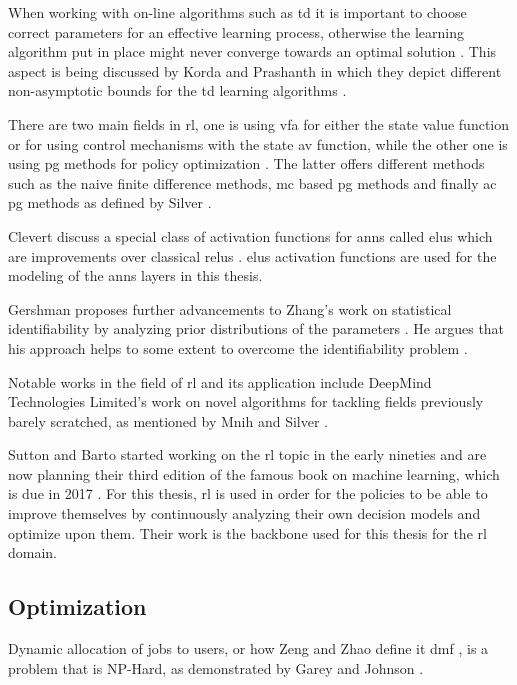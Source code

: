 \documentclass{seal_thesis}
\begin{document}
When working with on-line algorithms such as \gls{td} it is important to choose correct parameters for an effective learning process, otherwise the learning algorithm put in place might never converge towards an optimal solution \cite{Sutton2017}. This aspect is being discussed by Korda and Prashanth in which they depict different non-asymptotic bounds for the \gls{td} learning algorithms \cite{Korda2014}.

There are two main fields in \gls{rl}, one is using \gls{vfa} for either the state value function or for using control mechanisms with the state \gls{av} function, while the other one is using \gls{pg} methods for policy optimization \cite{Sutton2017}. The latter offers different methods such as the naive finite difference methods, \gls{mc} based \gls{pg} methods and finally \gls{ac} \gls{pg} methods as defined by Silver \etal \cite{Silver2014}.

Clevert \etal discuss a special class of activation functions for \glspl{ann} called \glspl{elu} which are improvements over classical \glspl{relu} \cite{Clevert2015}. \glspl{elu} activation functions are used for the modeling of the \glspl{ann} layers in this thesis.

Gershman proposes further advancements to Zhang's work on statistical identifiability \cite{Zhang2011} by analyzing prior distributions of the parameters \cite{Gershman2016}. He argues that his approach helps to some extent to overcome the identifiability problem \cite{Gershman2016}.

Notable works in the field of \gls{rl} and its application include DeepMind Technologies Limited's work on novel algorithms for tackling fields previously barely scratched, as mentioned by Mnih \etal and Silver \etal \cite{Mnih2015,Silver2016}.

Sutton and Barto started working on the \gls{rl} topic in the early nineties and are now planning their third edition of the famous book on machine learning, which is due in 2017 \cite{Sutton2017}. For this thesis, \gls{rl} is used in order for the policies to be able to improve themselves by continuously analyzing their own decision models and optimize upon them. Their work is the backbone used for this thesis for the \gls{rl} domain.

\subsection{Optimization}

Dynamic allocation of jobs to users, or how Zeng and Zhao define it \ie \gls{dmf} \cite{Zeng2005}, is a problem that is NP-Hard, as demonstrated by Garey and Johnson \cite{Garey1990}.
\end{document}
